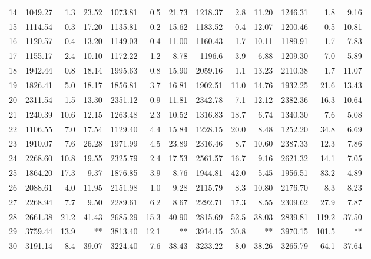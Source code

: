 \documentclass[11pt]{article}
\theoremstyle{plain}%
\theoremstyle{definition} \newtheorem{lem}{Lemma}[section]
\theoremstyle{definition} \newtheorem{claim}{Claim}[lem]
\theoremstyle{definition} \newtheorem{theorem}{Theorem}[section]
\theoremstyle{definition} \newtheorem{exo}{Exercice n$^\circ$}
\theoremstyle{definition} \newtheorem{quest}{}[exo]
\theoremstyle{definition} \newtheorem{sousquest}{}[quest]
\theoremstyle{remark}
\theoremstyle{definition}
\begin{document}
\begin{table}[H]
\begin{tabular}{r|rrr|rrr|rrr|rrr|}
    14    & 1049.27 & 1.3   & 23.52 &  1073.81 & 0.5   &  21.73  & 1218.37 & 2.8   & 11.20 & 1246.31 & 1.8&  9.16 \\
    15    & 1114.54 & 0.3   & 17.20 & 1135.81 & 0.2   & 15.62& 1183.52 & 0.4     & 12.07 & 1200.46 & 0.5 &  10.81 \\ 
    16    & 1120.57 & 0.4   & 13.20 & 1149.03 & 0.4   & 11.00& 1160.43 & 1.7 & 10.11 & 1189.91 & 1.7  & 7.83 \\ 
    17    & 1155.17 & 2.4   & 10.10 & 1172.22 & 1.2   &  8.78  & 1196.6 & 3.9  & 6.88  & 1209.30 & 7.0   & 5.89 \\
    18    & 1942.44 & 0.8   & 18.14 &  1995.63 & 0.8   &  15.90 & 2059.16 & 1.1 & 13.23 & 2110.38 &1.7 &11.07 \\ 
    19    & 1826.41 & 5.0   & 18.17 & 1856.81 & 3.7   &  16.81 & 1902.51 & 11.0  & 14.76 & 1932.25 & 21.6  & 13.43 \\
    20    & 2311.54 & 1.5   & 13.30 & 2351.12 & 0.9   & 11.81    & 2342.78 & 7.1 & 12.12 & 2382.36 & 16.3& 10.64 \\
    21    & 1240.39 & 10.6  & 12.15 &  1263.48 & 2.3   & 10.52& 1316.83 & 18.7  & 6.74  & 1340.30 & 7.6   &  5.08 \\ 
    22    & 1106.55 & 7.0   & 17.54 &1129.40 & 4.4   & 15.84 & 1228.15 & 20.0 & 8.48  & 1252.20 & 34.8  &  6.69 \\
    23    & 1910.07 & 7.6   & 26.28 &  1971.99 & 4.5   &23.89 & 2316.46 & 8.7  & 10.60 & 2387.33 & 12.3  & 7.86 \\ 
    24    & 2268.60 & 10.8  & 19.55 &  2325.79 & 2.4   &  17.53 & 2561.57 & 16.7 & 9.16  & 2621.32 & 14.1  &  7.05 \\
    25    & 1864.20 & 17.3  & 9.37  &  1876.85 & 3.9   & 8.76  & 1944.81 & 42.0 & 5.45  & 1956.51 & 83.2  & 4.89 \\
    26    & 2088.61 & 4.0   & 11.95 &  2151.98 & 1.0   &  9.28& 2115.79 & 8.3  & 10.80 & 2176.70 & 8.3 & 8.23 \\ 
    27    & 2268.94 & 7.7   & 9.50  & 2289.61 & 6.2   &  8.67& 2292.71 & 17.3  & 8.55 & 2309.62 & 27.9& 7.87 \\ 
    28    & 2661.38 & 21.2  & 41.43 & 2685.29 & 15.3  &  40.90 & 2815.69 & 52.5 & 38.03 & 2839.81 & 119.2 &37.50 \\
    29    & 3759.44 & 13.9  & **    & 3813.40 & 12.1  &  **& 3914.15 & 30.8   & **    & 3970.15 & 101.5& ** \\ 
    30    & 3191.14 & 8.4   & 39.07 &  3224.40 & 7.6   & 38.43& 3233.22 & 8.0  & 38.26 & 3265.79 & 64.1  &37.64 \\ 
    \bottomrule
    \end{tabular}%
  \label{tab:frac2}%
\end{table}%
\end{document}
